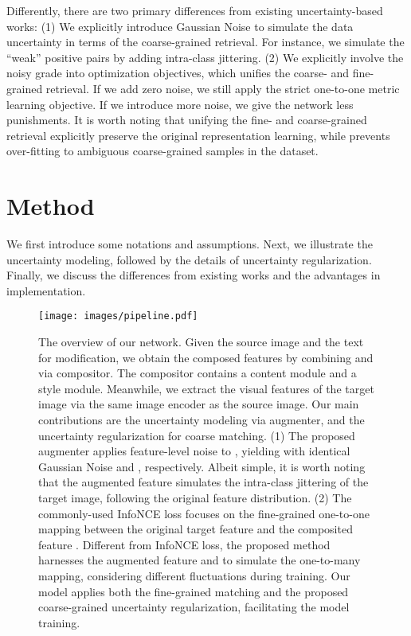\documentclass[10pt,twocolumn,letterpaper]{article}
\begin{document}
Differently, there are two primary differences from existing uncertainty-based works: (1) We explicitly introduce Gaussian Noise to simulate the data uncertainty in terms of the coarse-grained retrieval. For instance, we simulate the ``weak'' positive pairs by adding intra-class jittering.  
(2) We explicitly involve the noisy grade into optimization objectives, which unifies the coarse- and fine-grained retrieval. If we add zero noise, we still apply the strict one-to-one metric learning objective. If we introduce more noise, we give the network less punishments. It is worth noting that unifying the fine- and coarse-grained retrieval explicitly preserve the original representation learning, while prevents over-fitting to ambiguous coarse-grained samples in the dataset.
 

\section{Method} \label{sec:method}
We first introduce some notations and assumptions. Next, we illustrate the uncertainty modeling, followed by the details of uncertainty regularization. Finally, we discuss the differences from existing works and the advantages in implementation. 

\begin{figure*}[t]
\begin{center}\vspace{-.1in}
     \texttt{[image: images/pipeline.pdf]}
     \vspace{-.15in}
     \caption{The overview of our network.  
     Given the source image  and the text  for modification, we obtain the composed features  by combining  and  via compositor. The compositor contains a content module and a style module.
     Meanwhile, we extract the visual features  of the target image  via the same image encoder as the source image.  
     Our main contributions are the uncertainty modeling via augmenter, and the uncertainty regularization for coarse matching. 
     (1) The proposed augmenter applies feature-level noise to , yielding  with identical Gaussian Noise  and , respectively. Albeit simple, it is worth noting that the augmented feature  simulates the intra-class jittering of the target image, following the original feature distribution. 
     (2) The commonly-used InfoNCE loss focuses on the fine-grained one-to-one mapping between the original target feature  and the composited feature .
     Different from InfoNCE loss, the proposed method harnesses the augmented feature  and  to simulate the one-to-many mapping, considering different fluctuations during training. 
     Our model applies both the fine-grained matching and the proposed coarse-grained uncertainty regularization, facilitating the model training. 
     }
     \label{fig:pipeline} \vspace{-.2in}
\end{center} 
\end{figure*}
\end{document}
